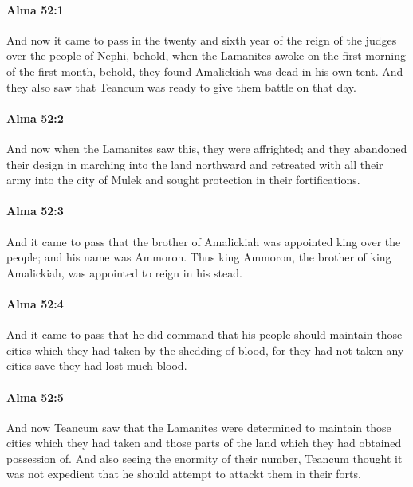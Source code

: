 		\paragraph{Alma 52:1} %
			\label{ALMA-52-1}

			And now it came to pass in the twenty and sixth year
			of the reign of the judges over the people of Nephi,
			behold, when the Lamanites awoke on the first morning of the first month,
			behold, they found Amalickiah was dead in his own tent.
			And they also saw that Teancum was ready to give them battle on that day.

		\paragraph{Alma 52:2} %
			\label{ALMA-52-2}

			And now when the Lamanites saw this, they were affrighted;
			and they abandoned their design in marching into the land northward
			and retreated with all their army into the city of Mulek
			and sought protection in their fortifications.

		\paragraph{Alma 52:3} %
			\label{ALMA-52-3}

			And it came to pass that
			the brother of Amalickiah was appointed king over the people;
			and his name was Ammoron.
			Thus king Ammoron, the brother of king Amalickiah,
			was appointed to reign in his stead.

		\paragraph{Alma 52:4} %
			\label{ALMA-52-4}

			And it came to pass that
			he did command that his people should maintain those cities
			which they had taken by the shedding of blood,
			for they had not taken any cities save they had lost much blood.

		\paragraph{Alma 52:5} %
			\label{ALMA-52-5}

			And now Teancum saw that the Lamanites were determined
			to maintain those cities which they had taken
			and those parts of the land which they had obtained possession of.
			And also seeing the enormity of their number,
			Teancum thought it was not expedient
			that he should attempt to attackt them in their forts.

